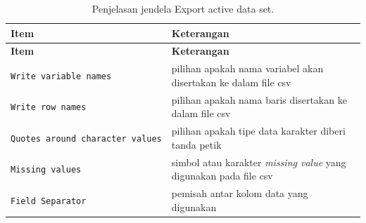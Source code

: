 \documentclass[12pt,]{krantz}
\begin{document}
\begin{longtable}[]{@{}ll@{}}
\caption{\label{tab:exdata} Penjelasan jendela Export active data set.}\tabularnewline
\toprule
\begin{minipage}[b]{0.29\columnwidth}\raggedright
\textbf{Item}\strut
\end{minipage} & \begin{minipage}[b]{0.65\columnwidth}\raggedright
\textbf{Keterangan}\strut
\end{minipage}\tabularnewline
\midrule
\endfirsthead
\toprule
\begin{minipage}[b]{0.29\columnwidth}\raggedright
\textbf{Item}\strut
\end{minipage} & \begin{minipage}[b]{0.65\columnwidth}\raggedright
\textbf{Keterangan}\strut
\end{minipage}\tabularnewline
\midrule
\endhead
\begin{minipage}[t]{0.29\columnwidth}\raggedright
\texttt{Write\ variable\ names}\strut
\end{minipage} & \begin{minipage}[t]{0.65\columnwidth}\raggedright
pilihan apakah nama variabel akan disertakan ke dalam file csv\strut
\end{minipage}\tabularnewline
\begin{minipage}[t]{0.29\columnwidth}\raggedright
\texttt{Write\ row\ names}\strut
\end{minipage} & \begin{minipage}[t]{0.65\columnwidth}\raggedright
pilihan apakah nama baris disertakan ke dalam file csv\strut
\end{minipage}\tabularnewline
\begin{minipage}[t]{0.29\columnwidth}\raggedright
\texttt{Quotes\ around\ character\ values}\strut
\end{minipage} & \begin{minipage}[t]{0.65\columnwidth}\raggedright
pilihan apakah tipe data karakter diberi tanda petik\strut
\end{minipage}\tabularnewline
\begin{minipage}[t]{0.29\columnwidth}\raggedright
\texttt{Missing\ values}\strut
\end{minipage} & \begin{minipage}[t]{0.65\columnwidth}\raggedright
simbol atau karakter \emph{missing value} yang digunakan pada file csv\strut
\end{minipage}\tabularnewline
\begin{minipage}[t]{0.29\columnwidth}\raggedright
\texttt{Field\ Separator}\strut
\end{minipage} & \begin{minipage}[t]{0.65\columnwidth}\raggedright
pemisah antar kolom data yang digunakan\strut
\end{minipage}\tabularnewline
\bottomrule
\end{longtable}
\end{document}
